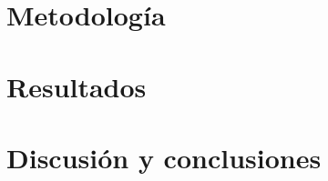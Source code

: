 \documentclass[colorinlistoftodos]{article}
\begin{document}
\section{Metodología}


\section{Resultados}

\section{Discusión y conclusiones}




\listoftodos%
\end{document}
